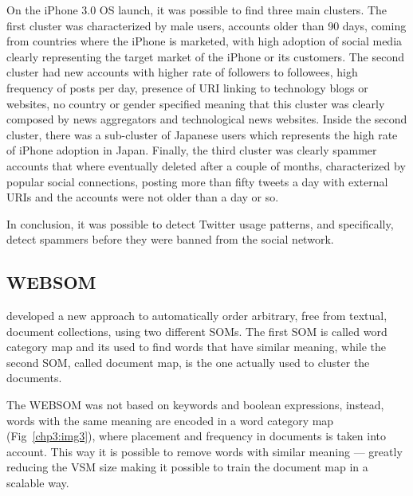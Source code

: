 On the iPhone 3.0 OS launch, it was possible to find three main clusters. The first cluster was characterized by male users, accounts older than 90 days, coming from countries where the iPhone is marketed, with high adoption of social media clearly representing the target market of the iPhone or its customers. The second cluster had new accounts with higher rate of followers to followees, high frequency of posts per day, presence of URI linking to technology blogs or websites, no country or gender specified meaning that this cluster was clearly composed by news aggregators and technological news websites. Inside the second cluster, there was a sub-cluster of Japanese users which represents the high rate of iPhone adoption in Japan. Finally, the third cluster was clearly spammer accounts that where eventually deleted after a couple of months, characterized by popular social connections, posting more than fifty tweets a day with external URIs and the accounts were not older than a day or so.

In conclusion, it was possible to detect Twitter usage patterns, and specifically, detect spammers before they were banned from the social network. 

\subsection{WEBSOM}
\label{sub:websom}
\citet{honkelawebsom} developed a new approach to automatically order arbitrary, free from textual, document collections, using two different SOMs. The first \ac{SOM} is called word category map and its used to find words that have similar meaning, while the second \ac{SOM}, called document map, is the one actually used to cluster the documents. 

The WEBSOM was not based on keywords and boolean expressions, instead, words with the same meaning are encoded in a word category map (Fig~\ref{chp3:img3}), where placement and frequency in documents is taken into account. This way it is possible to remove words with similar meaning --- greatly reducing the \ac{VSM} size  making it possible to train the document map in a scalable way.
                                                                                                          
